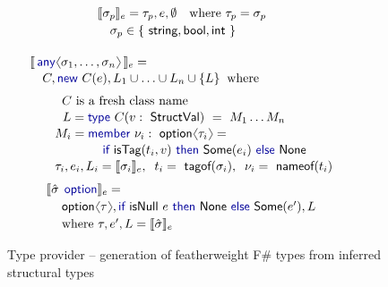 \documentclass[10pt,preprint,clearpagebib]{sigplanconf}
\newcommand{\langl}{\begin{picture}(4.5,7)
\put(1.1,2.5){\rotatebox{60}{\line(1,0){5.5}}}
\put(1.1,2.5){\rotatebox{300}{\line(1,0){5.5}}}
\end{picture}}
\newcommand{\rangl}{\begin{picture}(4.5,7)
\put(.9,2.5){\rotatebox{120}{\line(1,0){5.5}}}
\put(.9,2.5){\rotatebox{240}{\line(1,0){5.5}}}
\end{picture}}
\newcommand{\kvd}[1]{\textnormal{\textcolor{kvdclr}{\sffamily #1}}}
\newcommand{\ident}[1]{\textnormal{\sffamily #1}}
\newcommand{\tytagof}{\ident{tagof}}
\newcommand{\nameoftag}{\ident{nameof}}
\newcommand{\sem}[1]{\llbracket #1 \rrbracket}
\begin{document}
\begin{figure}
\begin{multicols}{2}
\noindent
\begin{equation*}
\hspace{-2.5em}
\begin{array}{l}
 \sem{\sigma_p}_e = \tau_p,e,\emptyset\quad\textnormal{where}~\tau_p = \sigma_p \\[0.2em]
\quad\sigma_p \in  \{~ \ident{string},\ident{bool},\ident{int}~\}\\[0.6em]
\end{array}
\end{equation*}
%
\begin{equation*}
\hspace{-2.5em}
\begin{array}{l}
 \sem{\,\kvd{any}\langl\sigma_1, \ldots, \sigma_n\rangl\,}_e = \\[0.1em]
 \quad C, \kvd{new}~C(e), L_1\cup\ldots\cup L_n\cup\{ L \}\;\;\textnormal{where}\\[0.6em]
 \qquad \;\;C~\textnormal{is a fresh class name} \\[0.1em]
 \qquad \;\,\,L = \kvd{type}~C(v:\ident{StructVal})~=~M_1\ldots M_n \\[0.1em]
 \qquad M_i = \kvd{member}~\nu_i:\ident{option}\langl\tau_i\rangl=\\[0.1em]
 \hspace{5.8em}  \kvd{if}~\ident{isTag}(t_i, v)~\kvd{then}~
     \ident{Some}(e_i)~\kvd{else}~\ident{None} \\[0.1em]
 \qquad \tau_i, e_i, L_i = \sem{\sigma_i}_e,\;\; t_i = \tytagof{(\sigma_i)},\;\; \nu_i=\nameoftag{(t_i)}
\end{array}
\end{equation*}
%
\begin{equation*}
\hspace{-2.5em}
\begin{array}{l}
 \sem{\hat{\sigma}\;\,\kvd{option}}_e = \\[0.2em]
 \hspace{1.25em} \ident{option}\langl\tau\rangl, \kvd{if}~\ident{isNull}~e~\kvd{then}~\ident{None}~\kvd{else}~\ident{Some}(e'), L\\[0.2em] 
 \hspace{1.25em} \textnormal{where}~\tau, e', L = \sem{\hat{\sigma}}_e
\end{array}
\end{equation*}
\end{multicols}

\caption{Type provider -- generation of featherweight F\# types from inferred structural types}
\label{fig:tp-generation}
\vspace{-0.5em}
\end{figure}
\end{document}
